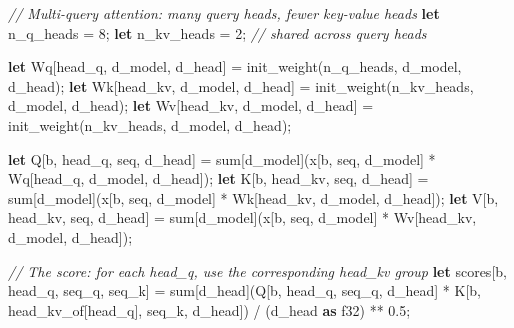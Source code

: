 \documentclass[11pt,]{article}
\newenvironment{Shaded}{}{}
\newcommand{\CommentTok}[1]{\textcolor[rgb]{0.38,0.63,0.69}{\textit{#1}}}
\newcommand{\DataTypeTok}[1]{\textcolor[rgb]{0.56,0.13,0.00}{#1}}
\newcommand{\DecValTok}[1]{\textcolor[rgb]{0.25,0.63,0.44}{#1}}
\newcommand{\KeywordTok}[1]{\textcolor[rgb]{0.00,0.44,0.13}{\textbf{#1}}}
\newcommand{\NormalTok}[1]{#1}
\newcommand{\OperatorTok}[1]{\textcolor[rgb]{0.40,0.40,0.40}{#1}}
\begin{document}
\begin{Shaded}
\begin{Highlighting}[]
\CommentTok{// Multi-query attention: many query heads, fewer key-value heads}
\KeywordTok{let}\NormalTok{ n_q_heads = }\DecValTok{8}\NormalTok{;}
\KeywordTok{let}\NormalTok{ n_kv_heads = }\DecValTok{2}\NormalTok{;   }\CommentTok{// shared across query heads}

\KeywordTok{let}\NormalTok{ Wq}\OperatorTok{[}\NormalTok{head_q, d_model, d_head}\OperatorTok{]}\NormalTok{ = init_weight(n_q_heads, d_model, d_head);}
\KeywordTok{let}\NormalTok{ Wk}\OperatorTok{[}\NormalTok{head_kv, d_model, d_head}\OperatorTok{]}\NormalTok{ = init_weight(n_kv_heads, d_model, d_head);}
\KeywordTok{let}\NormalTok{ Wv}\OperatorTok{[}\NormalTok{head_kv, d_model, d_head}\OperatorTok{]}\NormalTok{ = init_weight(n_kv_heads, d_model, d_head);}

\KeywordTok{let}\NormalTok{ Q}\OperatorTok{[}\NormalTok{b, head_q, seq, d_head}\OperatorTok{]}\NormalTok{ = sum}\OperatorTok{[}\NormalTok{d_model}\OperatorTok{]}\NormalTok{(x}\OperatorTok{[}\NormalTok{b, seq, d_model}\OperatorTok{]}\NormalTok{ * Wq}\OperatorTok{[}\NormalTok{head_q, d_model, d_head}\OperatorTok{]}\NormalTok{);}
\KeywordTok{let}\NormalTok{ K}\OperatorTok{[}\NormalTok{b, head_kv, seq, d_head}\OperatorTok{]}\NormalTok{ = sum}\OperatorTok{[}\NormalTok{d_model}\OperatorTok{]}\NormalTok{(x}\OperatorTok{[}\NormalTok{b, seq, d_model}\OperatorTok{]}\NormalTok{ * Wk}\OperatorTok{[}\NormalTok{head_kv, d_model, d_head}\OperatorTok{]}\NormalTok{);}
\KeywordTok{let}\NormalTok{ V}\OperatorTok{[}\NormalTok{b, head_kv, seq, d_head}\OperatorTok{]}\NormalTok{ = sum}\OperatorTok{[}\NormalTok{d_model}\OperatorTok{]}\NormalTok{(x}\OperatorTok{[}\NormalTok{b, seq, d_model}\OperatorTok{]}\NormalTok{ * Wv}\OperatorTok{[}\NormalTok{head_kv, d_model, d_head}\OperatorTok{]}\NormalTok{);}

\CommentTok{// The score: for each head_q, use the corresponding head_kv group}
\KeywordTok{let}\NormalTok{ scores}\OperatorTok{[}\NormalTok{b, head_q, seq_q, seq_k}\OperatorTok{]}\NormalTok{ =}
\NormalTok{    sum}\OperatorTok{[}\NormalTok{d_head}\OperatorTok{]}\NormalTok{(Q}\OperatorTok{[}\NormalTok{b, head_q, seq_q, d_head}\OperatorTok{]}\NormalTok{ *}
\NormalTok{                 K}\OperatorTok{[}\NormalTok{b, head_kv_of}\OperatorTok{[}\NormalTok{head_q}\OperatorTok{]}\NormalTok{, seq_k, d_head}\OperatorTok{]}\NormalTok{)}
\NormalTok{    / (d_head }\KeywordTok{as} \DataTypeTok{f32}\NormalTok{) ** }\DecValTok{0.5}\NormalTok{;}
\end{Highlighting}
\end{Shaded}
\end{document}
